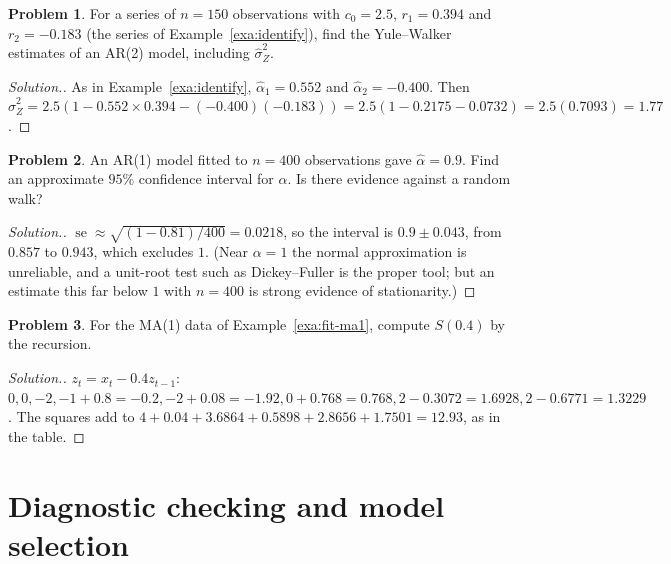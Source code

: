 \documentclass[11pt,a4paper]{article}
\theoremstyle{definition}
\newtheorem{problemx}{Problem}[subsection]
\newenvironment{problem}{\begin{problemx}}{\end{problemx}}
\newenvironment{solution}
  {\renewcommand{\qedsymbol}{}\begin{proof}[\textit{Solution}.]}
  {\end{proof}}
\begin{document}
\begin{problem}\label{prob:yw-ar2-fit}
For a series of $n = 150$ observations with $c_0 = 2.5$, $r_1 = 0.394$ and $r_2 = -0.183$ (the series of Example~\ref{exa:identify}), find the Yule--Walker
estimates of an AR(2) model, including $\hat\sigma_Z^2$.
\end{problem}

\begin{solution}
As in Example~\ref{exa:identify}, $\hat\alpha_1 = 0.552$ and $\hat\alpha_2 = -0.400$. Then
$\hat\sigma_Z^2 = 2.5(1 - 0.552 \times 0.394 - (-0.400)(-0.183)) = 2.5(1 - 0.2175 - 0.0732) = 2.5(0.7093) = 1.77$.
\end{solution}

\begin{problem}\label{prob:ar1-ci}
An AR(1) model fitted to $n = 400$ observations gave $\hat\alpha = 0.9$. Find an approximate $95\%$ confidence interval for $\alpha$. Is there
evidence against a random walk?
\end{problem}

\begin{solution}
$\operatorname{se} \approx \sqrt{(1 - 0.81)/400} = 0.0218$, so the interval is $0.9 \pm 0.043$, from $0.857$ to $0.943$, which excludes $1$. (Near $\alpha = 1$ the normal approximation
is unreliable, and a unit-root test such as Dickey--Fuller is the proper tool; but an estimate this far below $1$ with
$n = 400$ is strong evidence of stationarity.)
\end{solution}

\begin{problem}\label{prob:cls-recursion}
For the MA(1) data of Example~\ref{exa:fit-ma1}, compute $S(0.4)$ by the recursion.
\end{problem}

\begin{solution}
$z_t = x_t - 0.4z_{t-1}$: $0, 0, -2, -1 + 0.8 = -0.2, -2 + 0.08 = -1.92, 0 + 0.768 = 0.768, 2 - 0.3072 = 1.6928, 2 - 0.6771 = 1.3229$. The squares
add to $4 + 0.04 + 3.6864 + 0.5898 + 2.8656 + 1.7501 = 12.93$, as in the table.
\end{solution}

\pagebreak

\section{Diagnostic checking and model selection}\label{sec:diagnostics}
\end{document}
